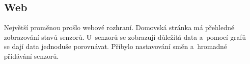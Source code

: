 \subsection{Web}
Největší proměnou prošlo webové rozhraní. Domovská stránka má přehledné zobrazování stavů senzorů. U~senzorů se zobrazují důležitá data a~pomocí grafů se dají data jednoduše porovnávat.
Přibylo nastavování směn a~hromadné přidávání senzorů.







\newpage